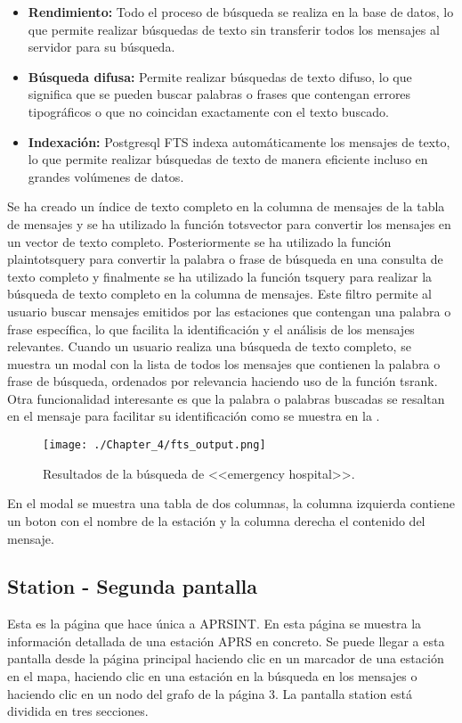 \begin{itemize}
	\item \textbf{Rendimiento:} Todo el proceso de búsqueda se realiza en la base de datos, lo que permite realizar búsquedas de texto sin transferir todos los mensajes al servidor para su búsqueda.
	\item \textbf{Búsqueda difusa:} Permite realizar búsquedas de texto difuso, lo que significa que se pueden buscar palabras o frases que contengan errores tipográficos o que no coincidan exactamente con el texto buscado.
	\item \textbf{Indexación:} Postgresql FTS indexa automáticamente los mensajes de texto, lo que permite realizar búsquedas de texto de manera eficiente incluso en grandes volúmenes de datos.
\end{itemize}
Se ha creado un índice de texto completo en la columna de mensajes de la tabla de mensajes y se ha utilizado la función to\textunderscore tsvector para convertir los mensajes en un vector de texto completo. Posteriormente se ha utilizado la función plainto\textunderscore tsquery para convertir la palabra o frase de búsqueda en una consulta de texto completo y finalmente se ha utilizado la función ts\textunderscore query para realizar la búsqueda de texto completo en la columna de mensajes. Este filtro permite al usuario buscar mensajes emitidos por las estaciones que contengan una palabra o frase específica, lo que facilita la identificación y el análisis de los mensajes relevantes.
Cuando un usuario realiza una búsqueda de texto completo, se muestra un modal con la lista de todos los mensajes que contienen la palabra o frase de búsqueda, ordenados por relevancia haciendo uso de la función ts\textunderscore rank. Otra funcionalidad interesante es que la palabra o palabras buscadas se resaltan en el mensaje para facilitar su identificación como se muestra en la .

\begin{figure}[h]
	\centering
	\texttt{[image: ./Chapter\_4/fts\_output.png]}
	\caption{Resultados de la búsqueda de <<emergency hospital>>.}
	\label{fig:postgres-fts}
\end{figure}

En el modal se muestra una tabla de dos columnas, la columna izquierda contiene un boton con el nombre de la estación y la columna derecha el contenido del mensaje.

\subsection{Station - Segunda pantalla}
Esta es la página que hace única a APRSINT. En esta página se muestra la información detallada de una estación APRS en concreto. Se puede llegar a esta pantalla desde la página principal haciendo clic en un marcador de una estación en el mapa, haciendo clic en una estación en la búsqueda en los mensajes o haciendo clic en un nodo del grafo de la página 3. La pantalla station está dividida en tres secciones.

